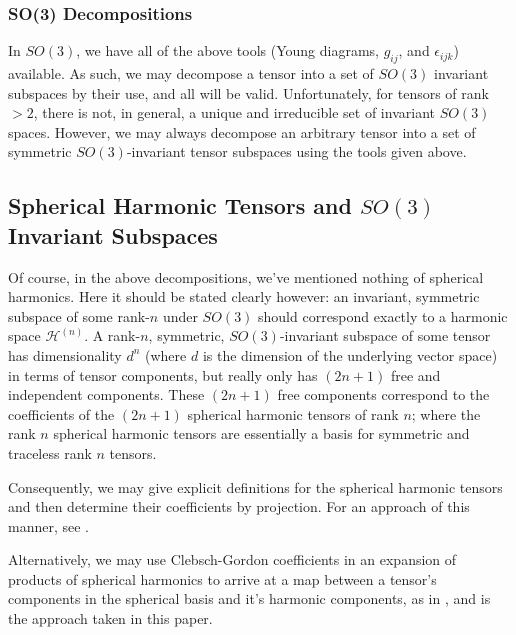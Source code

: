 \documentclass[10pt,a4paper]{article}
\begin{document}
\subsubsection{SO(3) Decompositions}

In $SO(3)$, we have all of the above tools (Young diagrams, $g_{ij}$, and $\epsilon_{ijk}$) available. As such, we may decompose a tensor into a set of $SO(3)$ invariant subspaces by their use, and all will be valid. Unfortunately, for tensors of rank$>2$, there is not, in general, a unique and irreducible set of invariant $SO(3)$ spaces. However, we may always decompose an arbitrary tensor into a set of symmetric $SO(3)$-invariant tensor subspaces using the tools given above.

\subsection{Spherical Harmonic Tensors and $SO(3)$ Invariant Subspaces}
Of course, in the above decompositions, we've mentioned nothing of spherical harmonics. Here it should be stated clearly however: an invariant, symmetric subspace of some rank-$n$ under $SO(3)$ should correspond exactly to a harmonic space $\mathcal{H}^{(n)}$. A rank-$n$, symmetric, $SO(3)$-invariant subspace of some tensor has dimensionality $d^n$ (where $d$ is the dimension of the underlying vector space) in terms of tensor components, but really only has $(2n+1)$ free and independent components. These $(2n+1)$ free components correspond to the coefficients of the $(2n+1)$ spherical harmonic tensors of rank $n$; where the rank $n$ spherical harmonic tensors are essentially a basis for symmetric and traceless rank $n$ tensors.

Consequently, we may give explicit definitions for the spherical harmonic tensors and then determine their coefficients by projection. For an approach of this manner, see \cite{harmonictensors}.

Alternatively, we may use Clebsch-Gordon coefficients in an expansion of products of spherical harmonics to arrive at a map between a tensor's components in the spherical basis and it's harmonic components, as in \cite{mochizuki1988spherical}, and is the approach taken in this paper.
\end{document}
